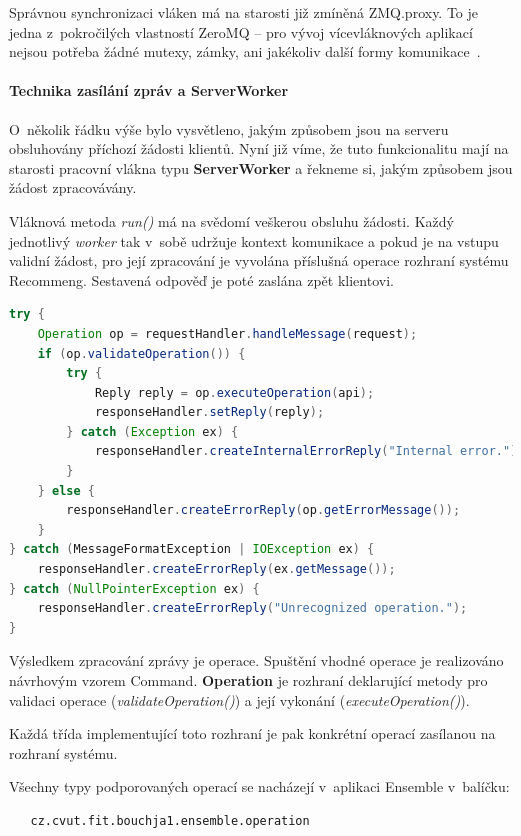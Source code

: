 \documentclass[thesis=M,czech]{FITthesis}[2014/05/07]
\begin{document}
Správnou synchronizaci vláken má na starosti již zmíněná ZMQ.proxy. To je jedna z~pokročilých vlastností ZeroMQ – pro vývoj vícevláknových aplikací nejsou potřeba žádné mutexy, zámky, ani jakékoliv další formy komunikace~\cite{mtserver}.

\paragraph{Technika zasílání zpráv a ServerWorker}
\label{serverworker}
O~několik řádku výše bylo vysvětleno, jakým způsobem jsou na serveru obsluhovány příchozí žádosti klientů. Nyní již víme, že tuto funkcionalitu mají na starosti pracovní vlákna typu \textbf{ServerWorker} a řekneme si, jakým způsobem jsou žádost zpracovávány.

Vláknová metoda \emph{run()} má na svědomí veškerou obsluhu žádosti. Každý jednotlivý \emph{worker} tak v~sobě udržuje kontext komunikace a pokud je na vstupu validní žádost, pro její zpracování je vyvolána příslušná operace rozhraní systému Recommeng. Sestavená odpověď je poté zaslána zpět klientovi.

\begin{lstlisting}[language=java]
try {
    Operation op = requestHandler.handleMessage(request);
    if (op.validateOperation()) {
        try {
            Reply reply = op.executeOperation(api);
            responseHandler.setReply(reply);
        } catch (Exception ex) {
            responseHandler.createInternalErrorReply("Internal error.");
        }
    } else {
        responseHandler.createErrorReply(op.getErrorMessage());
    }
} catch (MessageFormatException | IOException ex) {
    responseHandler.createErrorReply(ex.getMessage());
} catch (NullPointerException ex) {
    responseHandler.createErrorReply("Unrecognized operation.");
}
\end{lstlisting}

Výsledkem zpracování zprávy je operace. Spuštění vhodné operace je realizováno návrhovým vzorem Command. \textbf{Operation} je rozhraní deklarující metody pro validaci operace (\emph{validateOperation()}) a její vykonání (\emph{executeOperation()}).

Každá třída implementující toto rozhraní je pak konkrétní operací zasílanou na rozhraní systému. 

Všechny typy podporovaných operací se nacházejí v~aplikaci Ensemble v~balíčku:

\begin{verbatim}
   cz.cvut.fit.bouchja1.ensemble.operation
\end{verbatim}
\end{document}
